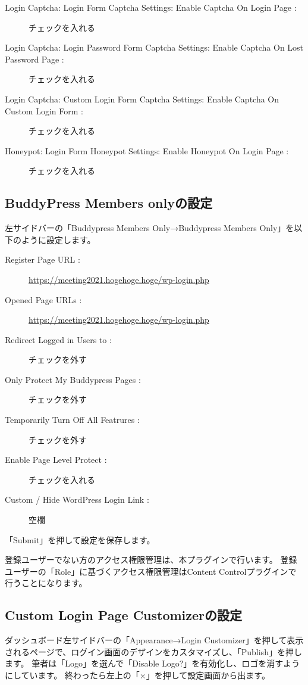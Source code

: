 \documentclass[titlepage,10pt,a4paper,uplatex]{jsbook}
\begin{document}
\begin{description}
\item[Login Captcha: Login Form Captcha Settings: Enable Captcha On Login Page : ] チェックを入れる
\item[Login Captcha: Login Password Form Captcha Settings: Enable Captcha On Lost Password Page : ] チェックを入れる
\item[Login Captcha: Custom Login Form Captcha Settings: Enable Captcha On Custom Login Form : ] チェックを入れる
\item[Honeypot: Login Form Honeypot Settings: Enable Honeypot On Login Page : ] チェックを入れる
\end{description}

\subsection{BuddyPress Members onlyの設定}

左サイドバーの「Buddypress Members Only→Buddypress Members Only」を以下のように設定します。

\begin{description}
\item[Register Page URL : ] \url{https://meeting2021.hogehoge.hoge/wp-login.php}
\item[Opened Page URLs : ] \url{https://meeting2021.hogehoge.hoge/wp-login.php}
\item[Redirect Logged in Users to : ] チェックを外す
\item[Only Protect My Buddypress Pages : ] チェックを外す
\item[Temporarily Turn Off All Featrures : ] チェックを外す
\item[Enable Page Level Protect : ] チェックを入れる
\item[Custom / Hide WordPress Login Link : ] 空欄
\end{description}

「Submit」を押して設定を保存します。

登録ユーザーでない方のアクセス権限管理は、本プラグインで行います。
登録ユーザーの「Role」に基づくアクセス権限管理はContent Controlプラグインで行うことになります。

\subsection{Custom Login Page Customizerの設定}

ダッシュボード左サイドバーの「Appearance→Login Customizer」を押して表示されるページで、ログイン画面のデザインをカスタマイズし、「Publish」を押します。
筆者は「Logo」を選んで「Disable Logo?」を有効化し、ロゴを消すようにしています。
終わったら左上の「×」を押して設定画面から出ます。
\end{document}

